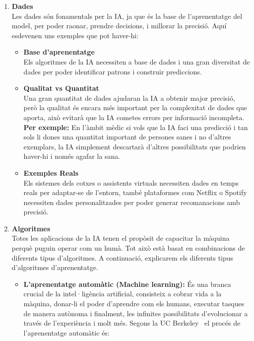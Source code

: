 \begin{enumerate}
    \item \textbf{Dades}\\
    Les dades són fonamentals per la IA, ja que és la base de l'aprenentatge del model, per poder raonar, prendre decisions, i millorar la precisió. Aquí esdevenen uns exemples que pot haver-hi:
    \begin{itemize}
        \item \textbf{Base d'aprenentatge}\\
        Els algoritmes de la IA necessiten a base de dades i una gran diversitat de dades per poder identificar patrons i construir prediccions.

        \item \textbf{Qualitat vs Quantitat}\\
        Una gran quantitat de dades ajudaran la IA a obtenir major precisió, però la qualitat és encara més important per la complexitat de dades que aporta, això evitarà que la IA cometes errors per informació incompleta.\textbf{ Per exemple:} En l'àmbit mèdic si vols que la IA faci una predicció i tan sols li dones una quantitat important de persones sanes i no d'altres exemplars, la IA simplement descartarà d'altres possibilitats que podrien haver-hi i només agafar la sana.

        \item \textbf{Exemples Reals}\\
        Els sistemes dels cotxes o assistents virtuals necessiten dades en temps reals per adaptar-se de l'entorn, també plataformes com Netflix o Spotify necessiten dades personalitzades per poder generar recomanacions amb precisió.
    \end{itemize}

    \item \textbf{Algoritmes}\\
    Totes les aplicacions de la IA tenen el propòsit de capacitar la màquina perquè puguin operar com un humà. Tot això està basat en combinacions de diferents tipus d'algoritmes. A continuació, explicarem els diferents tipus d'algoritmes d'aprenentatge.
    \begin{itemize}
        \item \textbf{L'aprenentatge automàtic (Machine learning):}\label{Aprenentatge_automàtic}
        És una branca crucial de la intel·ligència artificial, consisteix a cobrar vida a la màquina, donar-li el poder d'aprendre com els humans, executar tasques de manera autònoma i finalment, les infinites possibilitats d'evolucionar a través de l'experiència i molt més. Segons la UC Berkeley~\cite{Berkeley} el procés de l'aprenentatge automàtic és:


\end{itemize}
\end{enumerate}
